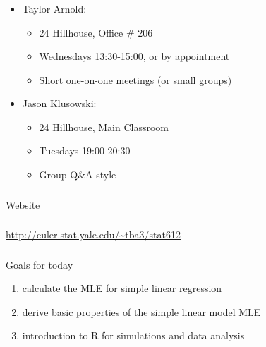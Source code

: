 \begin{frame}[fragile] \frametitle{}

\begin{itemize}
\item Taylor Arnold:
\begin{itemize}
\item 24 Hillhouse, Office \# 206
\item Wednesdays 13:30-15:00, or by appointment
\item Short one-on-one meetings (or small groups)
\end{itemize}
\item Jason Klusowski:
\begin{itemize}
\item 24 Hillhouse, Main Classroom
\item Tuesdays 19:00-20:30
\item Group Q\&A style
\end{itemize}
\end{itemize}

\end{frame}

\begin{frame}[fragile] \frametitle{}

\begin{flushright}
{\color{yaleblue}\sc\fontsize{1cm}{0cm}\selectfont Website}
\end{flushright}

\end{frame}


\begin{frame}[fragile] \frametitle{}

{\fontsize{0.5cm}{0cm}\selectfont
\url{http://euler.stat.yale.edu/~tba3/stat612}
}

\end{frame}

\begin{frame}[fragile] \frametitle{}

{\color{yaleblue}\fontsize{16pt}{20pt}\selectfont Goals for today}

\begin{enumerate}
\item calculate the MLE for simple linear regression
\item derive basic properties of the simple linear model MLE
\item introduction to R for simulations and data analysis
\end{enumerate}

\end{frame}

